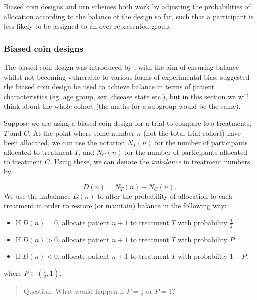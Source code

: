 \documentclass[
  openany]{book}
\providecommand{\tightlist}{%
  \setlength{\itemsep}{0pt}\setlength{\parskip}{0pt}}
\theoremstyle{definition}
\theoremstyle{definition}
\theoremstyle{definition}
\theoremstyle{definition}
\theoremstyle{remark}
\begin{document}
Biased coin designs and urn schemes both work by adjusting the probabilities of allocation according to the balance of the design so far, such that a participant is less likely to be assigned to an over-represented group.

\subsubsection{Biased coin designs}\label{biased-coin-designs}

The biased coin design was introduced by \citet{efron1971forcing}, with the aim of ensuring balance whilst not becoming vulnerable to various forms of experimental bias. \citet{efron1971forcing} suggested the biased coin design be used to achieve balance in terms of patient characteristics (eg. age group, sex, disease state etc.), but in this section we will think about the whole cohort (the maths for a subgroup would be the same).

Suppose we are using a biased coin design for a trial to compare two treatments, \(T\) and \(C\). At the point where some number \(n\) (not the total trial cohort) have been allocated, we can use the notation \(N_T\left(n\right)\) for the number of participants allocated to treatment \(T\), and \(N_C\left(n\right)\) for the number of participants allocated to treatment \(C\). Using these, we can denote the \emph{imbalance} in treatment numbers by

\[ D\left(n\right) = N_T\left(n\right) - N_C\left(n\right).\]
We use the imbalance \(D\left(n\right)\) to alter the probability of allocation to each treatment in order to restore (or maintain) balance in the following way:

\begin{itemize}
\tightlist
\item
  If \(D\left(n\right)=0\), allocate patient \(n+1\) to treatment \(T\) with probability \(\frac{1}{2}\).
\item
  If \(D\left(n\right)>0\), allocate patient \(n+1\) to treatment \(T\) with probability \(P\).
\item
  If \(D\left(n\right)<0\), allocate patient \(n+1\) to treatment \(T\) with probability \(1-P\).
\end{itemize}

where \(P\in\left(\frac{1}{2}, 1\right)\).

\begin{quote}
Question: What would happen if \(P=\frac{1}{2}\) or \(P=1\)?
\end{quote}
\end{document}
